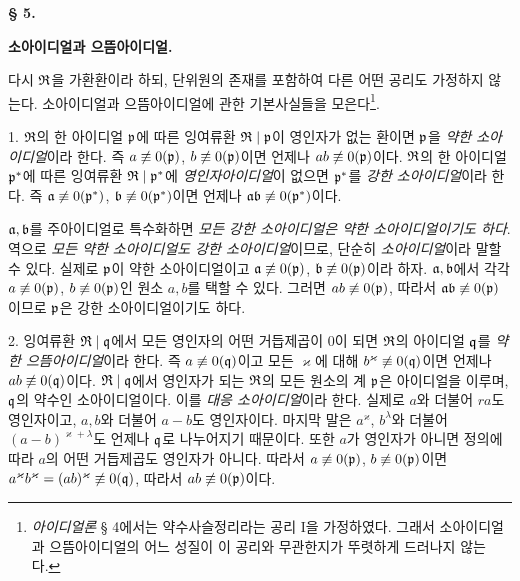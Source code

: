\begin{center}
{\bfseries\large § 5.\par}
\vspace{0.35em}
{\bfseries\large 소아이디얼과 으뜸아이디얼.\par}
\end{center}

다시 \(\mathfrak{R}\)을 가환환이라 하되, 단위원의 존재를 포함하여 다른 어떤 공리도 가정하지 않는다. 소아이디얼과 으뜸아이디얼에 관한 기본사실들을 모은다\footnote{\emph{아이디얼론} § 4에서는 약수사슬정리라는 공리 I을 가정하였다. 그래서 소아이디얼과 으뜸아이디얼의 어느 성질이 이 공리와 무관한지가 뚜렷하게 드러나지 않는다.}.

1. \(\mathfrak{R}\)의 한 아이디얼 \(\mathfrak{p}\)에 따른 잉여류환 \(\mathfrak{R}\mid\mathfrak{p}\)이 영인자가 없는 환이면 \(\mathfrak{p}\)을 \emph{약한 소아이디얼}이라 한다. 즉 \(a\not\equiv0(\mathfrak{p})\), \(b\not\equiv0(\mathfrak{p})\)이면 언제나 \(ab\not\equiv0(\mathfrak{p})\)이다. \(\mathfrak{R}\)의 한 아이디얼 \(\mathfrak{p}^*\)에 따른 잉여류환 \(\mathfrak{R}\mid\mathfrak{p}^*\)에 \emph{영인자아이디얼}이 없으면 \(\mathfrak{p}^*\)를 \emph{강한 소아이디얼}이라 한다. 즉 \(\mathfrak{a}\not\equiv0(\mathfrak{p}^*)\), \(\mathfrak{b}\not\equiv0(\mathfrak{p}^*)\)이면 언제나 \(\mathfrak{a}\mathfrak{b}\not\equiv0(\mathfrak{p}^*)\)이다.

\(\mathfrak{a},\mathfrak{b}\)를 주아이디얼로 특수화하면 \emph{모든 강한 소아이디얼은 약한 소아이디얼이기도 하다}. 역으로 \emph{모든 약한 소아이디얼도 강한 소아이디얼}이므로, 단순히 \emph{소아이디얼}이라 말할 수 있다. 실제로 \(\mathfrak{p}\)이 약한 소아이디얼이고 \(\mathfrak{a}\not\equiv0(\mathfrak{p})\), \(\mathfrak{b}\not\equiv0(\mathfrak{p})\)이라 하자. \(\mathfrak{a},\mathfrak{b}\)에서 각각 \(a\not\equiv0(\mathfrak{p})\), \(b\not\equiv0(\mathfrak{p})\)인 원소 \(a,b\)를 택할 수 있다. 그러면 \(ab\not\equiv0(\mathfrak{p})\), 따라서 \(\mathfrak{a}\mathfrak{b}\not\equiv0(\mathfrak{p})\)이므로 \(\mathfrak{p}\)은 강한 소아이디얼이기도 하다.

2. 잉여류환 \(\mathfrak{R}\mid\mathfrak{q}\)에서 모든 영인자의 어떤 거듭제곱이 0이 되면 \(\mathfrak{R}\)의 아이디얼 \(\mathfrak{q}\)를 \emph{약한 으뜸아이디얼}이라 한다. 즉 \(a\not\equiv0(\mathfrak{q})\)이고 모든 \(\varkappa\)에 대해 \(b^\varkappa\not\equiv0(\mathfrak{q})\)이면 언제나 \(ab\not\equiv0(\mathfrak{q})\)이다. \(\mathfrak{R}\mid\mathfrak{q}\)에서 영인자가 되는 \(\mathfrak{R}\)의 모든 원소의 계 \(\mathfrak{p}\)은 아이디얼을 이루며, \(\mathfrak{q}\)의 약수인 소아이디얼이다. 이를 \emph{대응 소아이디얼}이라 한다. 실제로 \(a\)와 더불어 \(ra\)도 영인자이고, \(a,b\)와 더불어 \(a-b\)도 영인자이다. 마지막 말은 \(a^\varkappa\), \(b^\lambda\)와 더불어 \((a-b)^{\varkappa+\lambda}\)도 언제나 \(\mathfrak{q}\)로 나누어지기 때문이다. 또한 \(a\)가 영인자가 아니면 정의에 따라 \(a\)의 어떤 거듭제곱도 영인자가 아니다. 따라서 \(a\not\equiv0(\mathfrak{p})\), \(b\not\equiv0(\mathfrak{p})\)이면 \(a^\varkappa b^\varkappa=(ab)^\varkappa\not\equiv0(\mathfrak{q})\), 따라서 \(ab\not\equiv0(\mathfrak{p})\)이다.

